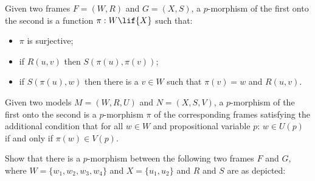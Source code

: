 \documentclass[../../../include/open-logic-section]{subfiles}
\begin{document}
\begin{definition}
  Given two frames ${F} = ({W}, R)$ and ${G} =
  ({X}, S)$, a $p$-morphism of the first onto the second is a
  function $\pi : {W} \lif {X}$ such that:
  \begin{itemize}
  \item $\pi$ is surjective;
  \item if $R(u,v)$ then $S(\pi(u),\pi(v))$;
  \item if $S(\pi(u),w)$ then there is a $v \in {W}$ such
    that $\pi(v)=w$ and $R(u,v)$.
  \end{itemize}
  Given two models ${M} = ({W}, R, U)$ and ${N} =
  ({X}, S, V)$, a $p$-morphism of the first onto the second is
  a $p$-morphism $\pi$ of the corresponding frames satisfying the
  additional condition that for all $w\in {W}$ and propositional
  variable $p$: $w \in U(p)$ if and only if $\pi(w) \in V(p)$.
  

\end{definition}

\begin{problem} [10 points]
  Show that there is a $p$-morphism between the following two frames
  ${F}$ and ${G}$, where ${W} = \{w_1, w_2,
  w_3, w_4\}$ and ${X} = \{u_1, u_2 \}$ and $R$ and $S$ are as
  depicted:

\begin{center}
\end{center}
\end{problem}
\end{document}
